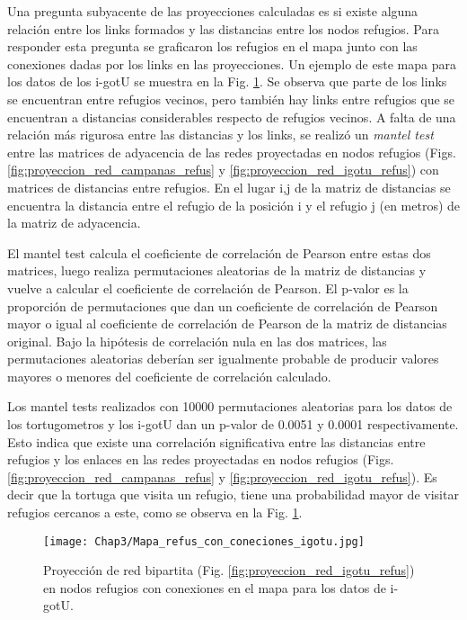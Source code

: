 Una pregunta subyacente de las proyecciones calculadas es si existe alguna relación entre los links formados y las distancias entre los nodos refugios. Para responder esta pregunta se graficaron los refugios en el mapa junto con las conexiones dadas por los links en las proyecciones. Un ejemplo de este mapa para los datos de los i-gotU se muestra en la Fig. \ref{fig:mapa_con_conexiones_igotu}. Se observa que parte de los links se encuentran entre refugios vecinos, pero también hay links entre refugios que se encuentran a distancias considerables respecto de refugios vecinos. A falta de una relación más rigurosa entre las distancias y los links, se realizó un \textit{mantel test} \cite{MantelTest} entre las matrices de adyacencia de las redes proyectadas en nodos refugios (Figs. \ref{fig:proyeccion_red_campanas_refus} y \ref{fig:proyeccion_red_igotu_refus}) con matrices de distancias entre refugios. En el lugar i,j de la matriz de distancias se encuentra la distancia entre el refugio  de la posición i y el refugio j (en metros) de la matriz de adyacencia.
 
El mantel test calcula el coeficiente de correlación de Pearson entre estas dos matrices, luego realiza permutaciones aleatorias de la matriz de distancias y vuelve a calcular el coeficiente de correlación de Pearson. El p-valor es la proporción de permutaciones que dan un coeficiente de correlación de Pearson mayor o igual al coeficiente de correlación de Pearson de la matriz de distancias original. Bajo la hipótesis de correlación nula en las dos matrices, las permutaciones aleatorias deberían ser igualmente probable de producir valores mayores o menores del coeficiente de correlación calculado.
 
 
Los mantel tests realizados con 10000 permutaciones aleatorias para los datos de los tortugometros y los i-gotU dan un p-valor de 0.0051 y 0.0001 respectivamente. Esto indica que existe una correlación significativa entre las distancias entre refugios y los enlaces en las redes proyectadas en nodos refugios (Figs. \ref{fig:proyeccion_red_campanas_refus} y \ref{fig:proyeccion_red_igotu_refus}). Es decir que la tortuga que visita un refugio, tiene una probabilidad mayor de visitar refugios cercanos a este, como se observa en la Fig. \ref{fig:mapa_con_conexiones_igotu}.
 
\begin{figure}[ht]
    \begin{center}
        \texttt{[image: Chap3/Mapa\_refus\_con\_coneciones\_igotu.jpg]}
        \caption[Proyección en nodos refugios con conexiones en el mapa.]{Proyección de red bipartita (Fig. \ref{fig:proyeccion_red_igotu_refus}) en nodos refugios con conexiones en el mapa para los datos de i-gotU. }
        \label{fig:mapa_con_conexiones_igotu}
       
        \end{center}
\end{figure}
 
 
 

